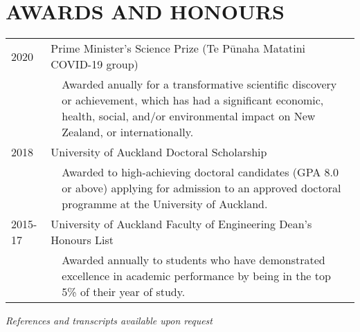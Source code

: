\documentclass[paper=a4paper,fontsize=11pt]{scrartcl} %
\newlength{\spacebox}
\newcommand{\NewPart}[1]{\section*{\uppercase{#1}}}
\newcommand{\AwardEntry}[3]{
    {#1} & \multicolumn{2}{l}{#2}\\
    & & \small{#3}\normalsize\\
}
\begin{document}
\NewPart{Awards and Honours}
\begin{tabular}{p{1.0\spacebox} p{0.2\spacebox} p{6.5\spacebox}}
    \AwardEntry{2020}{Prime Minister's Science Prize (Te P\=unaha Matatini COVID-19 group)}{Awarded anually for a transformative scientific discovery or achievement, which has had a significant economic, health, social, and/or environmental impact on New Zealand, or internationally.}
    \AwardEntry{2018}{University of Auckland Doctoral Scholarship}{Awarded to high-achieving doctoral candidates (GPA 8.0 or above) applying for admission to an approved doctoral programme at the University of Auckland.}
    \AwardEntry{2015-17}{University of Auckland Faculty of Engineering Dean's Honours List}{Awarded annually to students who have demonstrated excellence in academic performance by being in the top 5\% of their year of study.}
\end{tabular}

\vspace{1ex} \titlerule[2pt] \vspace{1ex}
\textit{References and transcripts available upon request}
\end{document}

